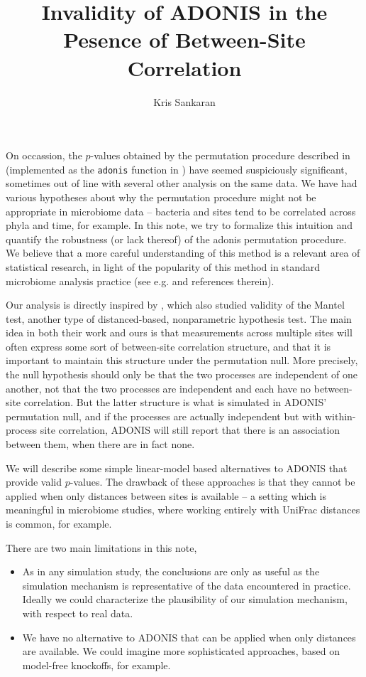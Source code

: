 \documentclass{article}
\title{Invalidity of ADONIS in the Pesence of Between-Site Correlation}
\author{Kris Sankaran}
\begin{document}
\maketitle

On occassion, the $p$-values obtained by the permutation procedure described in
\citep{anderson2001new} (implemented as the \texttt{adonis} function in
\cite{oksanen2007vegan}) have seemed suspiciously significant, sometimes out of
line with several other analysis on the same data. We have had various
hypotheses about why the permutation procedure might not be appropriate in
microbiome data -- bacteria and sites tend to be correlated across phyla and
time, for example. In this note, we try to formalize this intuition and quantify
the robustness (or lack thereof) of the adonis permutation procedure. We believe
that a more careful understanding of this method is a relevant area of
statistical research, in light of the popularity of this method in standard
microbiome analysis practice (see e.g. \cite{fukuyama2012comparisons} and
references therein).

Our analysis is directly inspired by \citep{guillot2013dismantling}, which also
studied validity of the Mantel test, another type of distanced-based,
nonparametric hypothesis test. The main idea in both their work and ours is that
measurements across multiple sites will often express some sort of between-site
correlation structure, and that it is important to maintain this structure under
the permutation null. More precisely, the null hypothesis should only be that
the two processes are independent of one another, not that the two processes are
independent and each have no between-site correlation. But the latter structure
is what is simulated in ADONIS' permutation null, and if the processes are
actually independent but with within-process site correlation, ADONIS will still
report that there is an association between them, when there are in fact none.

We will describe some simple linear-model based alternatives to ADONIS that
provide valid $p$-values. The drawback of these approaches is that they cannot
be applied when only distances between sites is available -- a setting which is
meaningful in microbiome studies, where working entirely with UniFrac distances
\citep{lozupone2005unifrac} is common, for example.

There are two main limitations in this note,

\begin{itemize}
\item As in any simulation study, the conclusions are only as useful as the
  simulation mechanism is representative of the data encountered in practice.
  Ideally we could characterize the plausibility of our simulation mechanism,
  with respect to real data.
\item We have no alternative to ADONIS that can be applied when only distances
  are available. We could imagine more sophisticated approaches, based on
  model-free knockoffs, for example.
\end{itemize}
\end{document}
